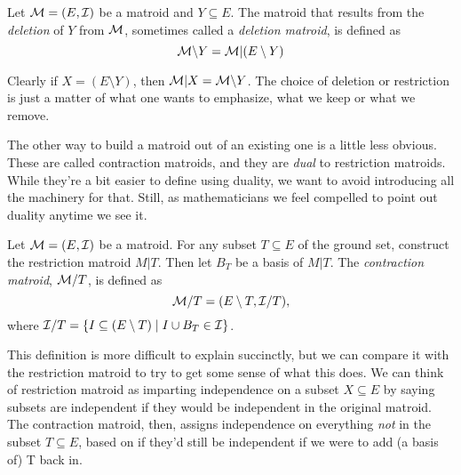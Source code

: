 \documentclass[12pt,oneside]{../../sfsuthesis}
\begin{document}
\begin{definition}\th\label{def:deletionMatroid}
    Let \( \mathcal{M} = (E, \mathcal{I}) \) be a matroid and \( Y \subseteq E \).
    The matroid that results from the \emph{deletion} of \( Y \) from \( \mathcal{M} \), sometimes called a \emph{deletion matroid}, is defined as
    \[
        \mathcal{M} \backslash Y = \mathcal{M}|(E \setminus Y)
    \]
\end{definition}

Clearly if \( X = (E \setminus Y) \), then \( \mathcal{M}|X = \mathcal{M} \backslash Y \).
The choice of deletion or restriction is just a matter of what one wants to emphasize, what we keep or what we remove.

The other way to build a matroid out of an existing one is a little less obvious.
These are called contraction matroids, and they are \emph{dual} to restriction matroids.
While they're a bit easier to define using duality, we want to avoid introducing all the machinery for that.
Still, as mathematicians we feel compelled to point out duality anytime we see it.

\begin{definition}\th\label{def:contractionMatroid}

    Let \( \mathcal{M} = (E, \mathcal{I}) \) be a matroid.
    For any subset \( T \subseteq E \) of the ground set, construct the restriction matroid \( M|T \).
    Then let \( B_T \) be a basis of \( M|T \).
    The \emph{contraction matroid}, \( \mathcal{M}/T \), is defined as
    \[
        \mathcal{M}/T = ( E \setminus T, \mathcal{I}/T ),
    \]
    where \( \mathcal{I}/T = \{ I \subseteq (E \setminus T) \; | \; I \cup B_T \in \mathcal{I} \} \).

\end{definition}

This definition is more difficult to explain succinctly, but we can compare it with the restriction matroid to try to get some sense of what this does.
We can think of  restriction matroid as imparting independence on a subset \( X \subseteq E \) by saying subsets are independent if they would be independent in the original matroid.
The contraction matroid, then, assigns independence on everything \emph{not} in the subset \( T \subseteq E \),  based on if they'd still be independent if we were to add (a basis of) T back in.
\end{document}
